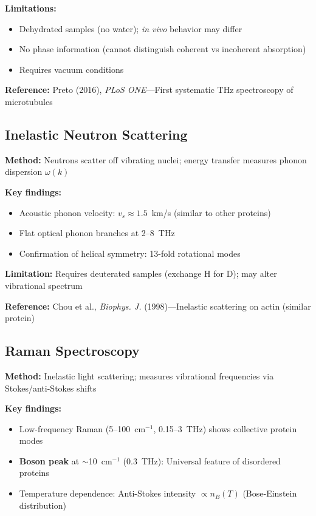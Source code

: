 \begin{warningbox}
\textbf{Limitations:}
\begin{itemize}
\item Dehydrated samples (no water); \emph{in vivo} behavior may differ
\item No phase information (cannot distinguish coherent vs incoherent absorption)
\item Requires vacuum conditions
\end{itemize}
\end{warningbox}

\textbf{Reference:} Preto (2016), \emph{PLoS ONE}---First systematic THz spectroscopy of microtubules

\subsection{Inelastic Neutron Scattering}

\textbf{Method:} Neutrons scatter off vibrating nuclei; energy transfer measures phonon dispersion $\omega(k)$

\textbf{Key findings:}
\begin{itemize}
\item Acoustic phonon velocity: $v_s \approx 1.5$~km/s (similar to other proteins)
\item Flat optical phonon branches at 2--8~THz
\item Confirmation of helical symmetry: 13-fold rotational modes
\end{itemize}

\textbf{Limitation:} Requires deuterated samples (exchange H for D); may alter vibrational spectrum

\textbf{Reference:} Chou et al., \emph{Biophys. J.} (1998)---Inelastic scattering on actin (similar protein)

\subsection{Raman Spectroscopy}

\textbf{Method:} Inelastic light scattering; measures vibrational frequencies via Stokes/anti-Stokes shifts

\textbf{Key findings:}
\begin{itemize}
\item Low-frequency Raman (5--100~cm$^{-1}$, 0.15--3~THz) shows collective protein modes
\item \textbf{Boson peak} at $\sim$10~cm$^{-1}$ (0.3~THz): Universal feature of disordered proteins
\item Temperature dependence: Anti-Stokes intensity $\propto n_B(T)$ (Bose-Einstein distribution)
\end{itemize}

